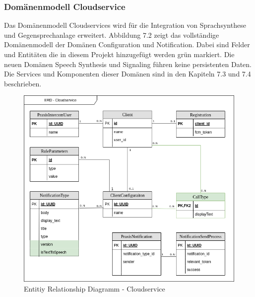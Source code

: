 \clearpage

\subsubsection{Domänenmodell Cloudservice}

Das Domänenmodell Cloudservices wird für die Integration von Sprachsynthese und Gegensprechanlage erweitert.
Abbildung 7.2 zeigt das vollständige Domänenmodell der Domänen Configuration und Notification.
Dabei sind Felder und Entitäten die in diesem Projekt hinzugefügt werden grün markiert.
Die neuen Domänen Speech Synthesis und Signaling führen keine persistenten Daten.
Die Services und Komponenten dieser Domänen sind in den Kapiteln 7.3 und 7.4 beschrieben.

\begin{figure}[h]
    \centering
    \begin{minipage}[b]{0.9\textwidth}
        \includegraphics[width=\textwidth]{graphics/diagramms/erd_v02}
        \caption{Entitiy Relationship Diagramm - Cloudservice}
    \end{minipage}
\end{figure}

\clearpage
